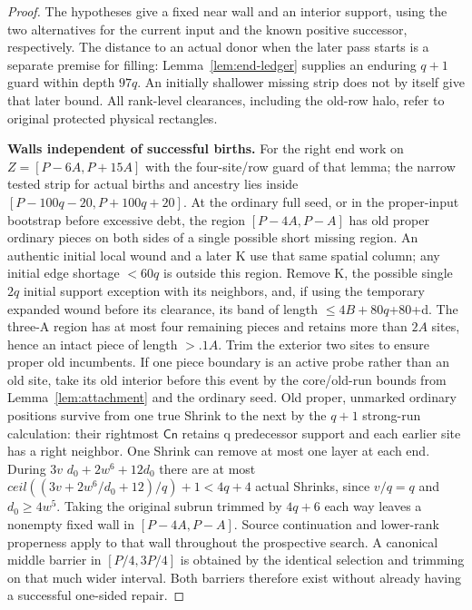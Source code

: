 \begin{proof}
The hypotheses give a fixed near wall and an interior support, using the two alternatives for the current input and the known positive successor, respectively. The distance to an actual donor when the later pass starts is a separate premise for filling: Lemma~\ref{lem:end-ledger} supplies an enduring \(q+1\) guard within depth \(97q\). An initially shallower missing strip does not by itself give that later bound. All rank-level clearances, including the old-row halo, refer to original protected physical rectangles.

\textbf{Walls independent of successful births.} For the right end work on \(Z=[P- 6A,P+15A]\) with the four-site/row guard of that lemma; the narrow tested strip for actual births and ancestry lies inside \([P- 100q- 20,P+100q+20]\). At the ordinary full seed, or in the proper-input bootstrap before excessive debt, the region \([P- 4A,P- A]\) has old proper ordinary pieces on both sides of a single possible short missing region. An authentic initial local wound and a later K use that same spatial column; any initial edge shortage \(<60q\) is outside this region. Remove K, the possible single \(2q\) initial support exception with its neighbors, and, if using the temporary expanded wound before its clearance, its band of length \(\le\)\(4B+80q\)+80+d. The three-A region has at most four remaining pieces and retains more than \(2A\) sites, hence an intact piece of length \(>.1A\). Trim the exterior two sites to ensure proper old incumbents. If one piece boundary is an active probe rather than an old site, take its old interior before this event by the core/old-run bounds from Lemma~\ref{lem:attachment} and the ordinary seed. Old proper, unmarked ordinary positions survive from one true Shrink to the next by the \(q+1\) strong-run calculation: their rightmost \(\mathsf{Cn}\) retains q predecessor support and each earlier site has a right neighbor. One Shrink can remove at most one layer at each end. During \(3v\) \(d_0+2w^6+12d_0\) there are at most \(ceil((3v+2w^6/d_0+12)/q)+1<4q+4\) actual Shrinks, since \(v/q=q\) and \(d_0\ge 4w^5\). Taking the original subrun trimmed by \(4q+6\) each way leaves a nonempty fixed wall in \([P- 4A,P- A]\). Source continuation and lower-rank properness apply to that wall throughout the prospective search. A canonical middle barrier in \([P/4,3P/4]\) is obtained by the identical selection and trimming on that much wider interval. Both barriers therefore exist without already having a successful one-sided repair.


\end{proof}

